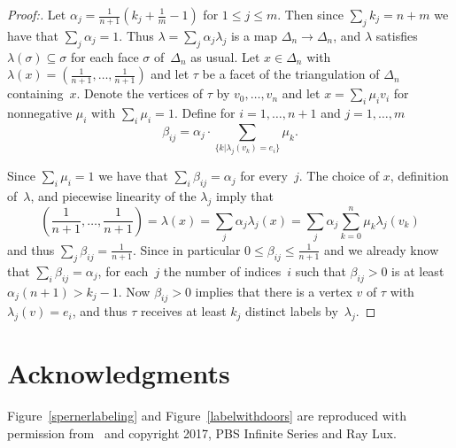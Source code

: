 \documentclass[a4paper,10pt,reqno, english]{amsart}
\theoremstyle{plain}
\theoremstyle{definition}
\begin{document}
\begin{proof}[Proof:]
	Let $\alpha_j = \frac{1}{n+1}(k_j+\frac1m-1)$ for $1 \le j \le m$. Then since $\sum_j k_j =n+m$ we have that $\sum_j \alpha_j = 1$. 
	Thus $\lambda = \sum_j \alpha_j\lambda_j$ is a map $\Delta_n \longrightarrow \Delta_n$, and $\lambda$ satisfies $\lambda(\sigma) \subseteq \sigma$
	for each face $\sigma$ of~$\Delta_n$ as usual. Let $x \in \Delta_n$ with $\lambda(x) = (\frac{1}{n+1}, \dots, \frac{1}{n+1})$ and let $\tau$ be a facet of the 
	triangulation of $\Delta_n$ containing~$x$. Denote the vertices of $\tau$ by $v_0, \dots, v_n$ and let $x = \sum_i \mu_iv_i$ for nonnegative
	$\mu_i$ with $\sum_i \mu_i = 1$. Define for $i = 1, \dots, n+1$ and $j = 1, \dots, m$
	$$\beta_{ij} = \alpha_j\cdot\sum_{\{k | \lambda_j(v_k) = e_i\}} \mu_k.$$
	
	Since $\sum_i \mu_i = 1$ we have that $\sum_i \beta_{ij} = \alpha_j$ for every~$j$. The choice of $x$, definition of~$\lambda$, and piecewise linearity
	of the $\lambda_j$ imply that
	$$\left(\frac{1}{n+1}, \dots, \frac{1}{n+1}\right) = \lambda(x) = \sum_j \alpha_j\lambda_j(x) = \sum_j \alpha_j \sum_{k=0}^n \mu_k\lambda_j(v_k)$$
	and thus $\sum_j \beta_{ij} = \frac{1}{n+1}$. Since in particular $0 \le \beta_{ij} \le \frac{1}{n+1}$ and we already know that $\sum_i \beta_{ij} = \alpha_j$, 
	for each~$j$ the number of indices~$i$ such
	that $\beta_{ij} > 0$ is at least $\alpha_j(n+1) > k_j-1$. Now $\beta_{ij} > 0$ implies that there is a vertex $v$ of $\tau$ with $\lambda_j(v) = e_i$, 
	and thus $\tau$ receives at least $k_j$ distinct labels by~$\lambda_j$.
\end{proof}



\section*{Acknowledgments}
\label{sec:ack}
	Figure~\ref{spernerlabeling} and Figure~\ref{labelwithdoors} are reproduced with permission from~\cite{houston-edwards2017} 
	and copyright 2017, PBS Infinite Series and Ray Lux.



\end{document}

